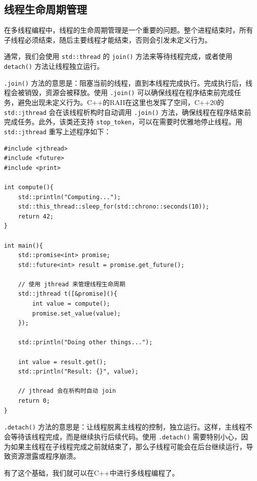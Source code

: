 \subsection{线程生命周期管理}

在多线程编程中，线程的生命周期管理是一个重要的问题。整个进程结束时，所有子线程必须结束，随后主要线程才能结束，否则会引发未定义行为。

通常，我们会使用 \verb|std::thread| 的 \verb|join()| 方法来等待线程完成，或者使用 \verb|detach()| 方法让线程独立运行。

\verb|.join()| 方法的意思是：阻塞当前的线程，直到本线程完成执行。完成执行后，线程会被销毁，资源会被释放。使用 \verb|.join()| 可以确保线程在程序结束前完成任务，避免出现未定义行为。C++的RAII在这里也发挥了空间，C++20的 \verb|std::jthread| 会在该线程析构时自动调用 \verb|.join()| 方法，确保线程在程序结束前完成任务。此外，该类还支持 \verb|stop_token|，可以在需要时优雅地停止线程。用 \verb|std::jthread| 重写上述程序如下：
\begin{verbatim}
#include <jthread>
#include <future>
#include <print>

int compute(){
    std::println("Computing...");
    std::this_thread::sleep_for(std::chrono::seconds(10));
    return 42;
}

int main(){
    std::promise<int> promise;
    std::future<int> result = promise.get_future();

    // 使用 jthread 来管理线程生命周期
    std::jthread t([&promise](){
        int value = compute();
        promise.set_value(value);
    });

    std::println("Doing other things...");

    int value = result.get();
    std::println("Result: {}", value);

    // jthread 会在析构时自动 join
    return 0;
}
\end{verbatim}

\verb|.detach()| 方法的意思是：让线程脱离主线程的控制，独立运行。这样，主线程不会等待该线程完成，而是继续执行后续代码。使用 \verb|.detach()| 需要特别小心，因为如果主线程在子线程完成之前就结束了，那么子线程可能会在后台继续运行，导致资源泄露或程序崩溃。

有了这个基础，我们就可以在C++中进行多线程编程了。

